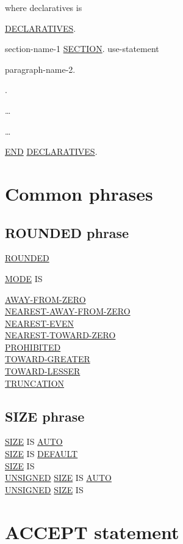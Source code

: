 \documentclass[a4paper,oneside,svgnames]{scrbook}
\makeatletter
\newcommand{\key}[1]{\underline{#1}}
\newcommand{\gnucobol}[1]{%
  \colorbox{orange!75}{#1}}
\newenvironment{0-1}{$\left[ \begin{tabular}{@{}l@{}}}{\end{tabular} \right]$}
\newenvironment{1=}{$\left\{ \begin{tabular}{@{}l@{}}}{\end{tabular} \right\}$}
\makeatother
\begin{document}
where declaratives is

\key{DECLARATIVES}.

\begin{0-1}
  section-name-1 \key{SECTION}.
  use-statement
  \begin{0-1}
    \begin{0-1}
      paragraph-name-2.
    \end{0-1}
    \imperativestatement .
  \end{0-1} \ldots
\end{0-1}\ldots

\key{END} \key{DECLARATIVES}.

\section{Common phrases}

\subsection{ROUNDED phrase}

\key{ROUNDED}
\begin{0-1}
  \key{MODE} IS
  \begin{1=}
    \key{AWAY-FROM-ZERO} \\
    \key{NEAREST-AWAY-FROM-ZERO} \\
    \key{NEAREST-EVEN} \\
    \key{NEAREST-TOWARD-ZERO} \\
    \key{PROHIBITED} \\
    \key{TOWARD-GREATER} \\
    \key{TOWARD-LESSER} \\
    \key{TRUNCATION}
  \end{1=}
\end{0-1}

\subsection{SIZE phrase}

\gnucobol{
  \begin{1=}
    \key{SIZE} IS \key{AUTO} \\
    \key{SIZE} IS \key{DEFAULT} \\
    \key{SIZE} IS \integer \\
    \key{UNSIGNED} \key{SIZE} IS \key{AUTO} \\
    \key{UNSIGNED} \key{SIZE} IS \integer
  \end{1=}
}
\section{ACCEPT statement}
\end{document}

